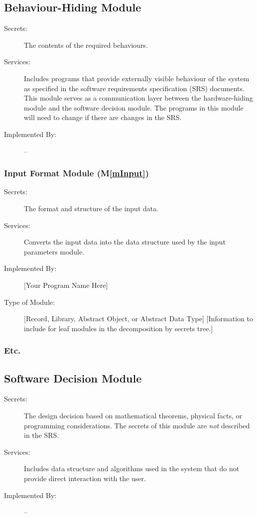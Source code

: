 \documentclass[12pt, titlepage]{article}
\newcommand{\mref}[1]{M\ref{#1}}
\begin{document}
\subsection{Behaviour-Hiding Module}

\begin{description}
\item[Secrets:]The contents of the required behaviours.
\item[Services:]Includes programs that provide externally visible behaviour of
  the system as specified in the software requirements specification (SRS)
  documents. This module serves as a communication layer between the
  hardware-hiding module and the software decision module. The programs in this
  module will need to change if there are changes in the SRS.
\item[Implemented By:] --
\end{description}

\subsubsection{Input Format Module (\mref{mInput})}

\begin{description}
\item[Secrets:]The format and structure of the input data.
\item[Services:]Converts the input data into the data structure used by the
  input parameters module.
\item[Implemented By:] [Your Program Name Here]
\item[Type of Module:] [Record, Library, Abstract Object, or Abstract Data Type]
  [Information to include for leaf modules in the decomposition by secrets tree.]
\end{description}

\subsubsection{Etc.}


\subsection{Software Decision Module}

\begin{description}
\item[Secrets:] The design decision based on mathematical theorems, physical
  facts, or programming considerations. The secrets of this module are
  \emph{not} described in the SRS.
\item[Services:] Includes data structure and algorithms used in the system that
  do not provide direct interaction with the user. 
\item[Implemented By:] --
\end{description}
\end{document}
